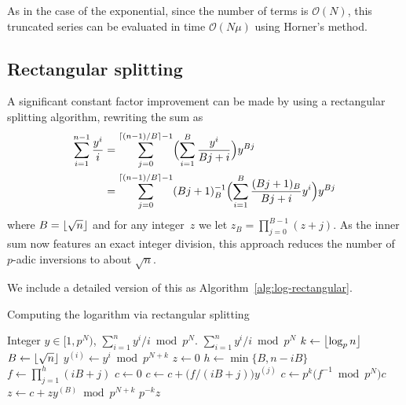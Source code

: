 As in the case of the exponential, since the number of terms 
is $\mathcal{O}(N)$, this truncated series can be evaluated 
in time $\mathcal{O}(N \mu)$ using Horner's method.

\subsection{Rectangular splitting}

A significant constant factor improvement can be made by using 
a rectangular splitting algorithm, rewriting the sum as 
\begin{equation}
\begin{split}
\sum_{i=1}^{n-1} \frac{y^i}{i}
& = \sum_{j=0}^{\left\lceil(n-1)/B\right\rceil - 1} \Bigl( \sum_{i=1}^B \frac{y^i}{Bj + i} \Bigr) y^{Bj} \\
& = \sum_{j=0}^{\left\lceil(n-1)/B\right\rceil - 1} (Bj+1)_B^{-1} \Bigl( \sum_{i=1}^B \frac{(Bj+1)_B}{Bj + i} y^i \Bigr) y^{Bj}
\end{split}
\end{equation}
where $B = \left\lfloor\sqrt{n}\right\rfloor$ and for any integer~$z$ 
we let $z_B = \prod_{j=0}^{B-1} (z + j)$.  As the inner 
sum now features an exact integer division, this approach 
reduces the number of $p$-adic inversions to about $\sqrt{n}$.

We include a detailed version of this as 
Algorithm~\ref{alg:log-rectangular}.

\begin{algorithm}
\caption{Computing the logarithm via rectangular splitting}
\label{alg:log-rectangular}
\begin{algorithmic}
\vspace{1mm}
\Require Integer $y \in [1,p^N)$, 
\Ensure  $\sum_{i=1}^n y^i / i \bmod{p^N}$.
\Return $\sum_{i=1}^{n} y^i / i \bmod{p^N}$
\Else
\State $k \gets \left\lfloor\log_p n\right\rfloor$
\State $B \gets \left\lfloor\sqrt{n}\right\rfloor$
\State $y^{(i)} \gets y^i \bmod {p^{N + k}}$
\EndFor
\State $z \gets 0$
\State $h \gets \min\{ B, n - iB \}$
\State $f \gets \prod_{j=1}^{h} (iB + j)$
\State $c \gets 0$
\State $c \gets c + \bigl(f / (iB + j)\bigr) y^{(j)}$
\EndFor
\State $c \gets p^k \bigl(f^{-1} \bmod {p^N}\bigr) c$
\State $z \gets c + z y^{(B)} \bmod{p^{N+k}}$
\EndFor
\Return $p^{-k} z$
\EndIf
\EndProcedure
\end{algorithmic}
\end{algorithm}

